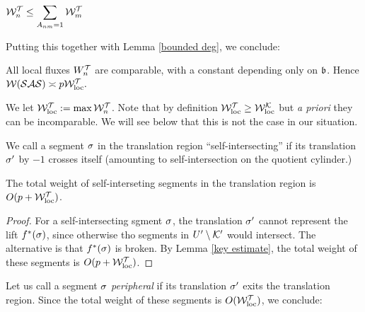 \begin{lem}
      $\displaystyle {{\mathcal W}_n^{\mathcal T}\leq \sum_{A_{nm} =1} {\mathcal W}_m^{\mathcal T}} $
\end{lem}  

Putting this together with Lemma \ref{bounded deg}, we conclude:

\begin{lem}\label{loc fluxes} 
  All local fluxes $W_n^{\mathcal T}  $ are comparable,
  with a constant  depending only on ${\mathfrak{b}}$.
Hence
$
     {\mathcal W}({\mathcal{SAS}}) \asymp p {\mathcal W}_{\mathrm{loc}}^{\mathcal T}.  
$
\end{lem}

We let ${\mathcal W}^{\mathcal T}_{\mathrm{loc}} : = \max {\mathcal W}^{\mathcal T}_n$.
Note that by definition ${\mathcal W}^{\mathcal T}_{\mathrm{loc}} \geq {\mathcal W}^{\mathcal K}_{\mathrm{loc}}$
but {\em a priori} they can be incomparable.    
We will see below that this is not the case in our situation. 

\msk



We call a segment ${\sigma}$  in the translation region
``self-intersecting''  if 
its translation ${\sigma}'$  by $-1$ crosses itself
(amounting to self-intersection on the quotient  cylinder.) 

\begin{lem}\label{self-intersecting segments} 
  The total weight of self-interseting segments in  the translation
  region is $O(p+{\mathcal W}_{\mathrm{loc}}^{\mathcal T})$.    
\end{lem}

\begin{proof}
For a self-intersecting sgment ${\sigma}$, the translation ${\sigma}'$ cannot
represent the lift $f^*({\sigma})$, since otherwise tho segments in $U'\setminus
{\mathcal K}'$ would intersect. The alternative is that $f^*({\sigma})$ is broken.
By Lemma \ref{key estimate}, the total weight of these segments is
$O(p+{\mathcal W}^{\mathcal T}_{\mathrm{loc}})$.
\end{proof}

Let us call a segment ${\sigma}$ {\em peripheral} if its translation ${\sigma}'$
exits the translation region.    
Since the total weight of these segments is  $O({\mathcal W}^{\mathcal T}_{\mathrm{loc}})$, 
we conclude: 


